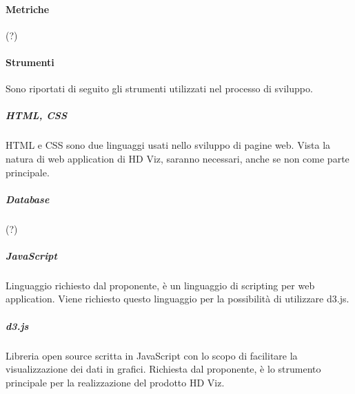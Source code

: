 \documentclass[../norme_di_progetto.tex]{subfiles}
\begin{document}
 \paragraph{Metriche}
 (?)
 
 \paragraph{Strumenti}
 Sono riportati di seguito gli strumenti utilizzati nel processo di sviluppo.
 
 \subparagraph{HTML, CSS}
 HTML e CSS sono due linguaggi usati nello sviluppo di pagine web. Vista la natura di web application di HD Viz, saranno necessari, anche se non come parte principale.
 
 \subparagraph{Database}
 (?)
 
 \subparagraph{JavaScript}
 Linguaggio richiesto dal proponente, è un linguaggio di scripting per web application. Viene richiesto questo linguaggio per la possibilità di utilizzare d3.js.
 
 \subparagraph{d3.js}
 Libreria open source scritta in JavaScript con lo scopo di facilitare la visualizzazione dei dati in grafici. Richiesta dal proponente, è lo strumento principale per la realizzazione del prodotto HD Viz.
 
\end{document}
